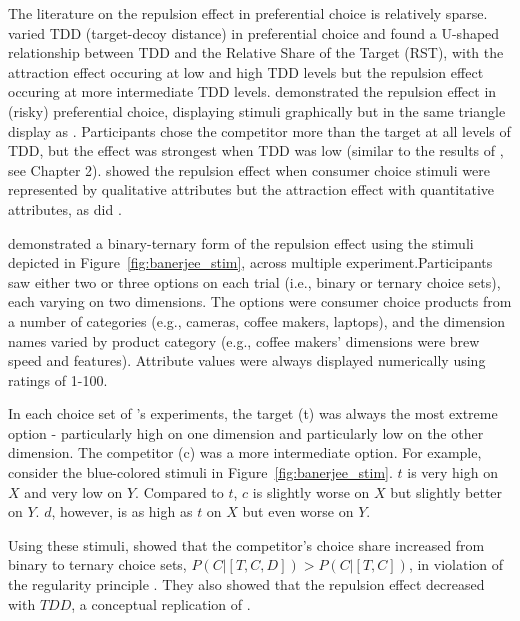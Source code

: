 The literature on the repulsion effect in preferential choice is relatively sparse. \textcite{liaoInfluenceDistanceDecoy2021} varied TDD (target-decoy distance) in preferential choice and found a U-shaped relationship between TDD and the Relative Share of the Target (RST), with the attraction effect occuring at low and high TDD levels but the repulsion effect occuring at more intermediate TDD levels. \textcite{spektorRepulsionEffectPreferential2022} demonstrated the repulsion effect in (risky) preferential choice, displaying stimuli graphically but in the same triangle display as \textcite{spektorWhenGoodLooks2018b}. Participants chose the competitor more than the target at all levels of TDD, but the effect was strongest when TDD was low (similar to the results of \textcite{spektorWhenGoodLooks2018b}, see Chapter 2). \textcite{brendlPreferentialAttractionEffects2023} showed the repulsion effect when consumer choice stimuli were represented by qualitative attributes but the attraction effect with quantitative attributes, as did \textcite{frederickLimitsAttraction2014b}. 

\textcite{banerjeeFactorsThatPromote2024} demonstrated a binary-ternary form of the repulsion effect using the stimuli depicted in Figure~\ref{fig:banerjee_stim}, across multiple experiment.Participants saw either two or three options on each trial (i.e., binary or ternary choice sets), each varying on two dimensions. The options were consumer choice products from a number of categories (e.g., cameras, coffee makers, laptops), and the dimension names varied by product category (e.g., coffee makers' dimensions were brew speed and features). Attribute values were always displayed numerically using ratings of 1-100.

In each choice set of \textcite{banerjeeFactorsThatPromote2024}'s experiments, the target (t) was always the most extreme option - particularly high on one dimension and particularly low on the other dimension. The competitor (c) was a more intermediate option. For example, consider the blue-colored stimuli in Figure~\ref{fig:banerjee_stim}. $t$ is very high on $X$ and very low on $Y$. Compared to $t$, $c$ is slightly worse on $X$ but slightly better on $Y$. $d$, however, is as high as $t$ on $X$ but even worse on $Y$. 

Using these stimuli, \textcite{banerjeeFactorsThatPromote2024} showed that the competitor's choice share increased from binary to ternary choice sets, $P(C|[T,C,D])>P(C|[T,C])$, in violation of the regularity principle \parencite{marley1989random,mackay1995probabilistic}. They also showed that the repulsion effect decreased with $TDD$, a conceptual replication of \textcite{spektorWhenGoodLooks2018b}.

